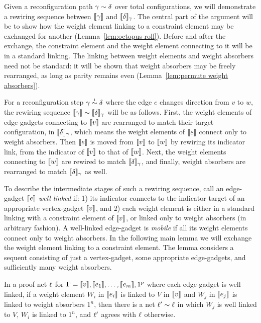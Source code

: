 \documentclass{lmcs}
\begin{document}
Given a reconfiguration path $\gamma\perm\delta$ over total configurations, we will demonstrate a rewiring sequence between $\llbracket\gamma\rrbracket$ and $\llbracket\delta\rrbracket_\gamma$.
%
The central part of the argument will be to show how the weight element linking to a constraint element may be exchanged for another (Lemma~\ref{lem:octopus roll}).
%
Before and after the exchange, the constraint element and the weight element connecting to it will be in a standard linking.
%
The linking between weight elements and weight absorbers need not be standard: it will be shown that weight absorbers may be freely rearranged, as long as parity remains even (Lemma~\ref{lem:permute weight absorbers}).



For a reconfiguration step $\gamma\perm*\delta$ where the edge $e$ changes direction from $v$ to $w$, the rewiring sequence $\itn\gamma\perm\itn\delta_\gamma$ will be as follows.
%
First, the weight elements of edge-gadgets connecting to $\llbracket v\rrbracket$ are rearranged to match their target configuration, in $\llbracket\delta\rrbracket_\gamma$, which means the weight elements of $\llbracket e\rrbracket$ connect only to weight absorbers.
%
Then $\llbracket e\rrbracket$ is moved from $\llbracket v\rrbracket$ to $\llbracket w\rrbracket$ by rewiring its indicator link, from the indicator of $\llbracket v\rrbracket$ to that of $\llbracket w\rrbracket$.
%
Next, the weight elements connecting to $\llbracket w\rrbracket$ are rewired to match $\llbracket\delta\rrbracket_\gamma$, and finally, weight absorbers are rearranged to match $\llbracket\delta\rrbracket_\gamma$ as well.



To describe the intermediate stages of such a rewiring sequence, call an edge-gadget $\llbracket e\rrbracket$ \emph{well linked} if: 1) its indicator connects to the indicator target of an appropriate vertex-gadget $\llbracket v\rrbracket$, and 2) each weight element is either in a standard linking with a constraint element of $\llbracket v\rrbracket$, or linked only to weight absorbers (in arbitrary fashion).
%
A well-linked edge-gadget is \emph{mobile} if all its weight elements connect only to weight absorbers.
%
In the following main lemma we will exchange the weight element linking to a constraint element.
%
The lemma considers a sequent consisting of just a vertex-gadget, some appropriate edge-gadgets, and sufficiently many weight absorbers.


\begin{lemma}
\label{lem:octopus roll}
In a proof net $\ell$ for $\Gamma=\llbracket v\rrbracket,\llbracket e_1\rrbracket,\dotsc,\llbracket e_m\rrbracket,1^p$ where each edge-gadget is well linked, if a weight element $W_i$ in $\llbracket e_i\rrbracket$ is linked to $V$ in $\llbracket v\rrbracket$ and $W_j$ in $\llbracket e_j\rrbracket$ is linked to weight absorbers $1^n$, then there is a net $\links'\perm\links$ in which $W_j$ is well linked to $V$, $W_i$ is linked to $1^n$, and $\ell'$ agrees with $\ell$ otherwise.
\end{lemma}
\end{document}
